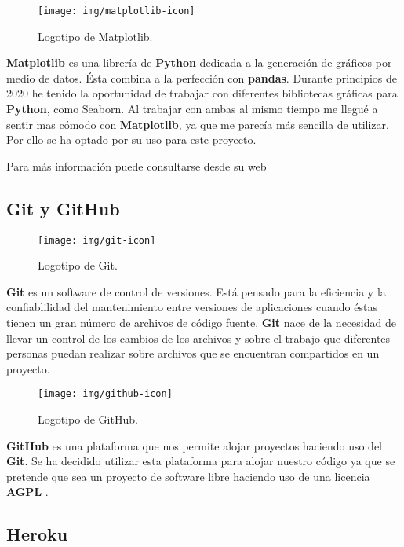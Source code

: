 \begin{figure}[H]
	\centering
	\texttt{[image: img/matplotlib-icon]}
	\caption{Logotipo de Matplotlib.}
\end{figure}

\textbf{Matplotlib} es una librería de \textbf{Python} dedicada a la generación de gráficos por medio de datos. Ésta combina a la perfección con \textbf{pandas}. Durante principios de 2020 he tenido la oportunidad de trabajar con diferentes bibliotecas gráficas para \textbf{Python}, como Seaborn. Al trabajar con ambas al mismo tiempo me llegué a sentir mas cómodo con \textbf{Matplotlib}, ya que me parecía más sencilla de utilizar. Por ello se ha optado por su uso para este proyecto.

Para más información puede consultarse desde su web \cite{matplotlib}

\subsection{Git y GitHub}

\begin{figure}[H]
	\centering
	\texttt{[image: img/git-icon]}
	\caption{Logotipo de Git.}
\end{figure}

\textbf{Git} es un software de control de versiones. Está pensado para la eficiencia y la confiablilidad del mantenimiento entre versiones de aplicaciones cuando éstas tienen un gran número de archivos de código fuente. \textbf{Git} nace de la necesidad de llevar un control de los cambios de los archivos y sobre el trabajo que diferentes personas puedan realizar sobre archivos que se encuentran compartidos en un proyecto.

\begin{figure}[H]
	\centering
	\texttt{[image: img/github-icon]}
	\caption{Logotipo de GitHub.}
\end{figure}

\textbf{GitHub} es una plataforma que nos permite alojar proyectos haciendo uso del \textbf{Git}. Se ha decidido utilizar esta plataforma para alojar nuestro código ya que se pretende que sea un proyecto de software libre haciendo uso de una licencia \textbf{AGPL} \cite{agplv3}.

\subsection{Heroku}

